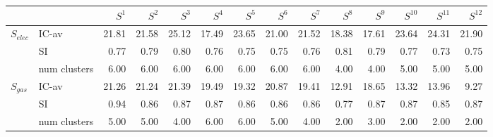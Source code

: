 \begin{tabular}{llrrrrrrrrrrrr}
\toprule
 &  & $S^{1}$ & $S^{2}$ & $S^{3}$ & $S^{4}$ & $S^{5}$ & $S^{6}$ & $S^{7}$ & $S^{8}$ & $S^{9}$ & $S^{10}$ & $S^{11}$ & $S^{12}$ \\
\midrule
\multirow[c]{3}{*}{$S_{elec}$} & IC-av & 21.81 & 21.58 & 25.12 & 17.49 & 23.65 & 21.00 & 21.52 & 18.38 & 17.61 & 23.64 & 24.31 & 21.90 \\
 & SI & 0.77 & 0.79 & 0.80 & 0.76 & 0.75 & 0.75 & 0.76 & 0.81 & 0.79 & 0.77 & 0.73 & 0.75 \\
 & num clusters & 6.00 & 6.00 & 6.00 & 6.00 & 6.00 & 6.00 & 6.00 & 4.00 & 4.00 & 5.00 & 5.00 & 5.00 \\
\multirow[c]{3}{*}{$S_{gas}$} & IC-av & 21.26 & 21.24 & 21.39 & 19.49 & 19.32 & 20.87 & 19.41 & 12.91 & 18.65 & 13.32 & 13.96 & 9.27 \\
 & SI & 0.94 & 0.86 & 0.87 & 0.87 & 0.86 & 0.86 & 0.86 & 0.77 & 0.87 & 0.87 & 0.85 & 0.87 \\
 & num clusters & 5.00 & 5.00 & 4.00 & 6.00 & 6.00 & 5.00 & 4.00 & 2.00 & 3.00 & 2.00 & 2.00 & 2.00 \\
\bottomrule
\end{tabular}
